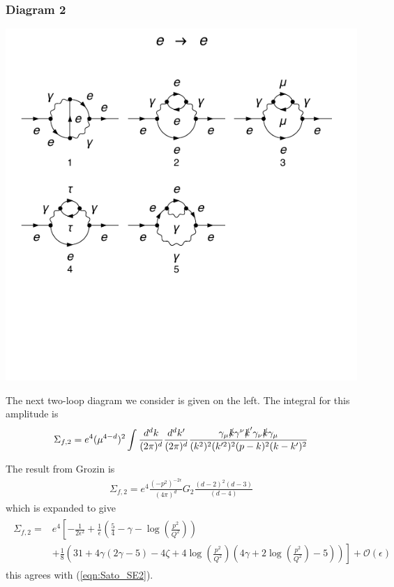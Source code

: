 \documentclass[11pt]{article}
\begin{document}
\subsubsection{Diagram 2}
\noindent\begin{minipage}{0.3\textwidth}
\begin{center}
\includegraphics{QED_F_2loop_3.pdf}
\end{center}
\end{minipage}
\noindent\begin{minipage}{0.7\textwidth}

The next two-loop diagram we consider is given on the left.  The integral for this amplitude is
\begin{align}
\Sigma_{f,2} = e^4 (\mu^{4-d})^2 \int \frac{d^dk}{(2\pi)^d}  \frac{d^dk'}{(2\pi)^d} \frac{ \gamma_{\mu}\slashed{k}\gamma^{\nu}\slashed{k}'\gamma_{\nu}\slashed{k}\gamma_{\mu}} { (k^2)^2(k'^2)^2(p-k)^2(k-k')^2}
\end{align}
\end{minipage}


The result from Grozin is
\begin{align}
\Sigma_{f,2} = e^4 \frac{(-p^2)^{-2\epsilon}}{(4\pi)^d} G_2   \frac{(d-2)^2(d-3)}{(d-4)}
\end{align}
which is expanded to give
\begin{align}
\begin{split}
\Sigma_{f,2} = &e^4 \left[ -\frac{1}{2\epsilon^2} + \frac{1}{\epsilon}\left(
\frac{5}{4}-\gamma-\log\left(\frac{p^2}{Q^2}\right)\right) \right.\\&\left.+ \frac{1}{8}\left(
31 +
4\gamma(2\gamma-5) - 4\zeta + 4\log\left(\frac{p^2}{Q^2}\right) \left( 4\gamma+2\log\left(\frac{p^2}{Q^2}\right)-5\right)
 \right) \right] + \mathcal{O}(\epsilon)
\end{split}
\end{align}
this agrees with (\ref{eqn:Sato_SE2}).
\end{document}
